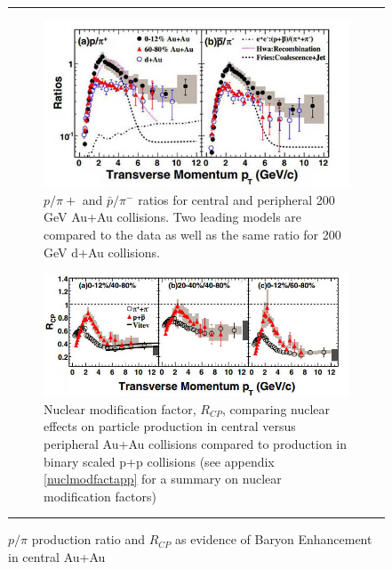 \begin{figure}
\centering    \rule{35em}{0.5pt}
\begin{subfigure}[b]{0.7\textwidth}
    \centering
    \includegraphics[width=\textwidth]{prevplots/ppiratiocentvsperiph.JPG}
    \caption{ $p/\pi{+}$ and $\bar{p}/\pi^{-}$ ratios for central and peripheral 200 GeV Au+Au collisions. Two leading models are compared to the data as well as the same ratio for 200 GeV d+Au collisions.}
    \label{fig:ppiratiocentvsperiph}
\end{subfigure}
\begin{subfigure}[b]{0.8\textwidth}
    \centering
    \includegraphics[width=\textwidth]{prevplots/Rcpcentvsperiph.jpg}
    \caption{Nuclear modification factor, $R_{CP}$, comparing nuclear effects on particle production in central versus peripheral Au+Au collisions compared to production in binary scaled p+p collisions (see appendix \ref{nuclmodfactapp} for a summary on nuclear modification factors)}
    \label{fig:Rcpcentvsperiph}
\end{subfigure}
\caption[Evidence of Baryon Enhancement in Au+Au collisions]{$p/\pi$ production ratio and $R_{CP}$ as evidence of Baryon Enhancement in central Au+Au}
\label{fig:baryonenhancementAA}    \rule{35em}{0.5pt}
\end{figure}

